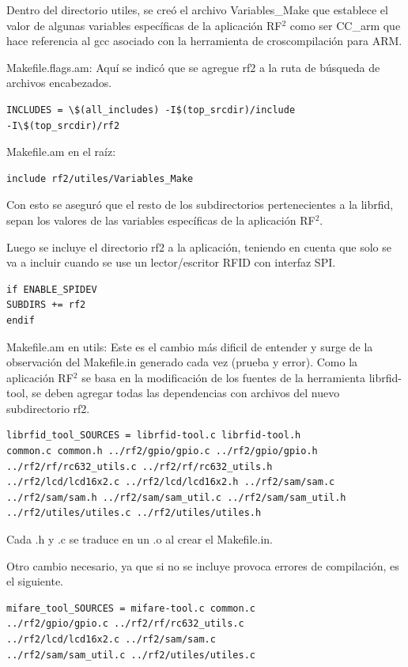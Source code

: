 Dentro del directorio utiles, se creó el archivo Variables\_Make que establece el valor de algunas variables específicas de la aplicación RF$^{2}$ como ser CC\_arm que hace referencia al gcc asociado con la herramienta de croscompilación para ARM. 

\bigskip
Makefile.flags.am:
Aquí se indicó que se agregue rf2 a la ruta de búsqueda de archivos encabezados.

\begin{verbatim}
INCLUDES = \$(all_includes) -I$(top_srcdir)/include 
-I\$(top_srcdir)/rf2
\end{verbatim}

Makefile.am en el raíz:

\begin{verbatim}
include rf2/utiles/Variables_Make
\end{verbatim}
Con esto se aseguró que el resto de los subdirectorios pertenecientes a la librfid, sepan los valores de las variables específicas de la aplicación RF$^{2}$.

\bigskip
Luego se incluye el directorio rf2 a la aplicación, teniendo en cuenta que solo se va a incluir cuando se use un lector/escritor RFID con interfaz SPI.
\begin{verbatim}
if ENABLE_SPIDEV 
SUBDIRS += rf2 
endif
\end{verbatim}

Makefile.am en utils:
Este es el cambio más dificil de entender y surge de la observación del Makefile.in generado cada vez (prueba y error). Como la aplicación RF$^{2}$ se basa en la modificación de los fuentes de la herramienta librfid-tool, se deben agregar todas las dependencias con archivos del nuevo subdirectorio rf2.

\begin{verbatim}
librfid_tool_SOURCES = librfid-tool.c librfid-tool.h 
common.c common.h ../rf2/gpio/gpio.c ../rf2/gpio/gpio.h 
../rf2/rf/rc632_utils.c ../rf2/rf/rc632_utils.h 
../rf2/lcd/lcd16x2.c ../rf2/lcd/lcd16x2.h ../rf2/sam/sam.c 
../rf2/sam/sam.h ../rf2/sam/sam_util.c ../rf2/sam/sam_util.h 
../rf2/utiles/utiles.c ../rf2/utiles/utiles.h
\end{verbatim}

Cada .h y .c se traduce en un .o al crear el Makefile.in.

\bigskip
Otro cambio necesario, ya que si no se incluye provoca errores de compilación, es el siguiente.

\begin{verbatim}
mifare_tool_SOURCES = mifare-tool.c common.c 
../rf2/gpio/gpio.c ../rf2/rf/rc632_utils.c 
../rf2/lcd/lcd16x2.c ../rf2/sam/sam.c 
../rf2/sam/sam_util.c ../rf2/utiles/utiles.c
\end{verbatim}

